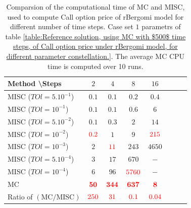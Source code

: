 \documentclass[11pt]{article}
\begin{document}
\begin{table}[h!]
	\centering
	\begin{tabular}{l*{6}{c}r}
		Method \textbackslash  Steps            & $2$ & $4$ & $8$ & $16$ &   \\
		\hline
		MISC ($TOl=5.10^{-1}$)  & $0.1$ & $0.1$ & $0.2$ & $0.4$  \\
		MISC ($TOl=10^{-1}$)  & $0.1$ & $0.1$ & $0.6$ & $6$  \\
		MISC ($TOl=5.10^{-2}$)  & $0.1$ & $0.3$ & $2$ & $14$  \\
		MISC ($TOl=10^{-2}$)  & ${\color{red}0.2}$ & $1$ & $9$ & ${\color{red}215}$  \\
		MISC ($TOl=10^{-3}$)  & $2$ & ${\color{red}11}$ & $243$ & $4650$  \\
			MISC ($TOl=5.10^{-4}$)  & $3$ & $17$ & $ 670$ & $-$  \\
		MISC ($TOl=10^{-4}$)  & $6$ & $96$ & ${\color{red}5760}$ & $-$  \\
		\hline
			MC     & $\mathbf{{\color{red} 50}}$  & $\mathbf{{\color{red}344}}$  & $\mathbf{{\color{red}637}}$ & $\mathbf{{\color{red}8}}$  \\
	\hline
			Ratio of $\left(\text{MC}/ \text{MISC} \right)$  &${\color{red}  250}$ & ${\color{red}    31
		}$  & ${\color{red} 0.1
		}$  & ${\color{red}  0.04}$ \\
		\hline
	\end{tabular}
	\caption{Comparsion of the computational time of  MC and MISC, used to compute Call option price of rBergomi model for different number of time steps. Case set $1$ parametrs of table \ref{table:Reference solution, using MC with $500$ time steps, of Call option price under rBergomi model, for different parameter constellation.}. The
average MC CPU time is computed over 10 runs. }
	\label{Comparison of the computational time of  MC and MISC, used to compute Call option price of rBergomi model for different number of time steps. Case set1}
\end{table}
\end{document}
